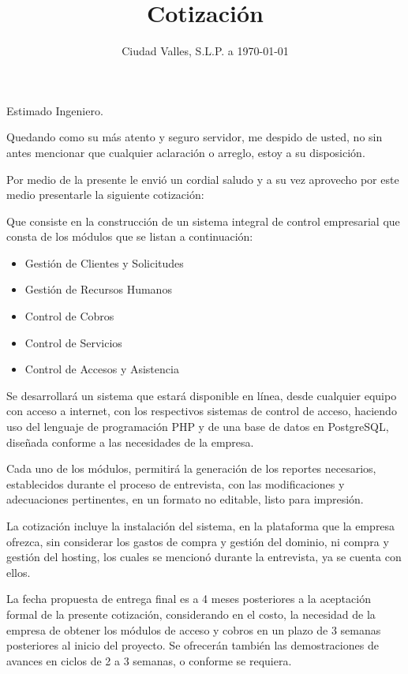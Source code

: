 \documentclass[10pt,letterpaper,sans]{moderncv}
\title{Cotización}
\begin{document}
\date{Ciudad Valles, S.L.P. a \today}
\opening{Estimado Ingeniero.}
\closing{Quedando como su más atento y seguro servidor, me despido de usted, no sin antes mencionar que cualquier aclaración o arreglo, estoy a su disposición.}
\makelettertitle

Por medio de la presente le envió un cordial saludo y a su vez aprovecho por este medio presentarle la siguiente cotización:

Que consiste en la construcción de un sistema integral de control empresarial que consta de los módulos que se listan a continuación:

\begin{itemize}
  \item Gestión de Clientes y Solicitudes
  \item Gestión de Recursos Humanos
  \item Control de Cobros
  \item Control de Servicios
  \item Control de Accesos y Asistencia
\end{itemize}

Se desarrollará un sistema que estará disponible en línea, desde cualquier equipo con acceso a internet, con los respectivos sistemas de control de acceso, haciendo uso del lenguaje de programación PHP y de una base de datos en PostgreSQL, diseñada conforme a las necesidades de la empresa.

Cada uno de los módulos, permitirá la generación de los reportes necesarios, establecidos durante el proceso de entrevista, con las modificaciones y adecuaciones pertinentes, en un formato no editable, listo para impresión.

La cotización incluye la instalación del sistema, en la plataforma que la empresa ofrezca, sin considerar los gastos de compra y gestión del dominio, ni compra y gestión del hosting, los cuales se mencionó durante la entrevista, ya se cuenta con ellos.

La fecha propuesta de entrega final es a 4 meses posteriores a la aceptación formal de la presente cotización, considerando en el costo, la necesidad de la empresa de obtener los módulos de acceso y cobros en un plazo de 3 semanas posteriores al inicio del proyecto. Se ofrecerán también las demostraciones de avances en ciclos de 2 a 3 semanas, o conforme se requiera.
\end{document}
